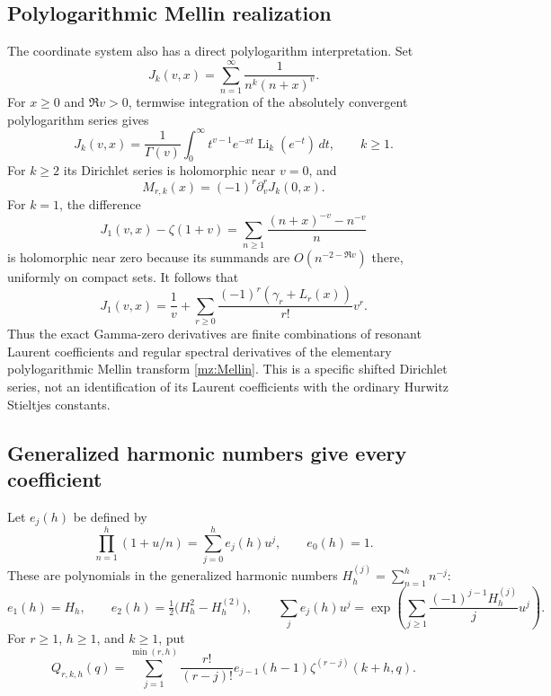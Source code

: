\subsection{Polylogarithmic Mellin realization}

The coordinate system also has a direct polylogarithm interpretation. Set
\begin{equation}
 J_k(v,x)=\sum_{n=1}^{\infty}\frac1{n^k(n+x)^v}.
 \label{mz:J}
\end{equation}
For $x\ge0$ and $\Re v>0$, termwise integration of the absolutely
convergent polylogarithm series gives
\begin{equation}
 J_k(v,x)=\frac1{\Gamma(v)}\int_0^{\infty}
     t^{v-1}e^{-xt}\operatorname{Li}_k(e^{-t})\,dt,
       \qquad k\ge1.
 \label{mz:Mellin}
\end{equation}
For $k\ge2$ its Dirichlet series is holomorphic near $v=0$, and
\[
 M_{r,k}(x)=(-1)^r\partial_v^rJ_k(0,x).
\]
For $k=1$, the difference
\[
 J_1(v,x)-\zeta(1+v)
 =\sum_{n\ge1}\frac{(n+x)^{-v}-n^{-v}}n
\]
is holomorphic near zero because its summands are $O(n^{-2-\Re v})$
there, uniformly on compact sets. It follows that
\begin{equation}
 J_1(v,x)=\frac1v+
       \sum_{r\ge0}\frac{(-1)^r(\gamma_r+L_r(x))}{r!}v^r.
 \label{mz:JLaurent}
\end{equation}
Thus the exact Gamma-zero derivatives are finite combinations of resonant
Laurent coefficients and regular spectral derivatives of the elementary
polylogarithmic Mellin transform \eqref{mz:Mellin}. This is a specific
shifted Dirichlet series, not an identification of its Laurent coefficients
with the ordinary Hurwitz Stieltjes constants.

\subsection{Generalized harmonic numbers give every coefficient}

Let $e_j(h)$ be defined by
\begin{equation}
 \prod_{n=1}^{h}(1+u/n)=\sum_{j=0}^{h}e_j(h)u^j,
 \qquad e_0(h)=1.
 \label{mz:e}
\end{equation}
These are polynomials in the generalized harmonic numbers
$H_h^{(j)}=\sum_{n=1}^h n^{-j}$:
\[
 e_1(h)=H_h,\qquad
 e_2(h)=\tfrac12\bigl(H_h^2-H_h^{(2)}\bigr),\qquad
 \sum_j e_j(h)u^j
  =\exp\left(\sum_{j\ge1}\frac{(-1)^{j-1}H_h^{(j)}}j u^j\right).
\]
For $r\ge1$, $h\ge1$, and $k\ge1$, put
\begin{equation}
 Q_{r,k,h}(q)
   =\sum_{j=1}^{\min(r,h)}\frac{r!}{(r-j)!}
           e_{j-1}(h-1)\zeta^{(r-j)}(k+h,q).
 \label{mz:Q}
\end{equation}

